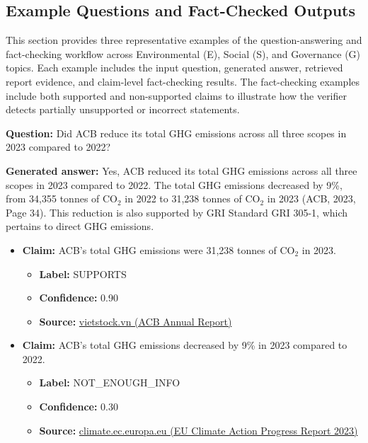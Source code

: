 \documentclass[sn-mathphys, oneside]{sn-jnl}
\begin{document}
{\subsection{Example Questions and Fact-Checked Outputs}
\label{sec:appendix_examples}

This section provides three representative examples of the question-answering and fact-checking workflow across Environmental (E), Social (S), and Governance (G) topics. Each example includes the input question, generated answer, retrieved report evidence, and claim-level fact-checking results. The fact-checking examples include both supported and non-supported claims to illustrate how the verifier detects partially unsupported or incorrect statements.

\begin{tcolorbox}[colback=white,colframe=black!65,boxrule=0.6pt,arc=0pt,left=8pt,right=8pt,top=8pt,bottom=8pt]

\textbf{Question:} Did ACB reduce its total GHG emissions across all three scopes in 2023 compared to 2022?

\textbf{Generated answer:} Yes, ACB reduced its total GHG emissions across all three scopes in 2023 compared to 2022. The total GHG emissions decreased by 9\%, from 34,355 tonnes of CO$_2$ in 2022 to 31,238 tonnes of CO$_2$ in 2023 (ACB, 2023, Page 34). This reduction is also supported by GRI Standard GRI 305-1, which pertains to direct GHG emissions.

\begin{itemize}
    \item \textbf{Claim:} ACB's total GHG emissions were 31,238 tonnes of CO$_2$ in 2023.
    \begin{itemize}
        \item \textbf{Label:} SUPPORTS
        \item \textbf{Confidence:} 0.90
        \item \textbf{Source:} \href{https://static2.vietstock.vn/vietstock/2025/3/26/20250325_acb_250325_annual_report_2025.pdf}{vietstock.vn (ACB Annual Report)}
    \end{itemize}

    \item \textbf{Claim:} ACB's total GHG emissions decreased by 9\% in 2023 compared to 2022.
    \begin{itemize}
        \item \textbf{Label:} NOT\_ENOUGH\_INFO
        \item \textbf{Confidence:} 0.30
        \item \textbf{Source:} \href{https://climate.ec.europa.eu/news-other-reads/news/climate-action-progress-report-2023-shows-largest-annual-drop-emissions-decades-2024-10-31_en}{climate.ec.europa.eu (EU Climate Action Progress Report 2023)}
    \end{itemize}
\end{itemize}


\end{tcolorbox}}
\end{document}
